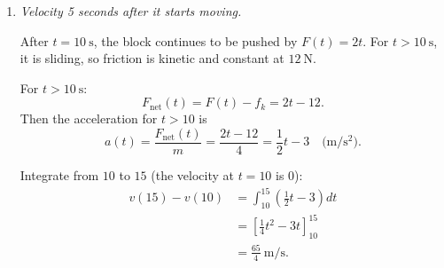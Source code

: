 \documentclass[12pt]{article}
\begin{document}
\begin{enumerate}
\begin{enumerate}
    Just after $t = 10~\text{s}$, the block is in motion, so kinetic friction applies with constant magnitude $f_k = 12~\text{N}$ opposing the motion.

    The applied force at $t=10~\text{s}$ is
    \[
    F(10) = 2(10) = 20~\text{N}.
    \]

    Net horizontal force just after motion begins:
    \[
    F_{\text{net}} = F - f_k = 20 - 12 = 8~\text{N}.
    \]

    Newton's second law:
    \[
    a = \frac{F_{\text{net}}}{m}
    = \frac{8}{4}
    = 2~\text{m/s}^2.
    \]

    So the block's initial acceleration (once it breaks free) is $2~\text{m/s}^2$.

    \item \textit{Velocity 5 seconds after it starts moving.}

    After $t=10~\text{s}$, the block continues to be pushed by $F(t)=2t$. For $t>10~\text{s}$, it is sliding, so friction is kinetic and constant at $12~\text{N}$.

    For $t>10~\text{s}$:
    \[
    F_{\text{net}}(t) = F(t) - f_k = 2t - 12.
    \]
    Then the acceleration for $t>10$ is
    \[
    a(t) = \frac{F_{\text{net}}(t)}{m}
    = \frac{2t - 12}{4}
    = \frac{1}{2}t - 3
    \quad \text{(m/s$^2$)}.
    \]

    
    Integrate from $10$ to $15$ (the velocity at $t=10$ is $0$):
    \begin{align*}
    v(15) - v(10)
    &= \int_{10}^{15} \left( \frac{1}{2}t - 3 \right) dt \\
    &= \left[ \frac{1}{4}t^2 -3t \right]_{10}^{15} \\
    &= \frac{65}{4}~\text{m/s}.
    \end{align*}
\end{enumerate}

\end{enumerate}
\end{document}
